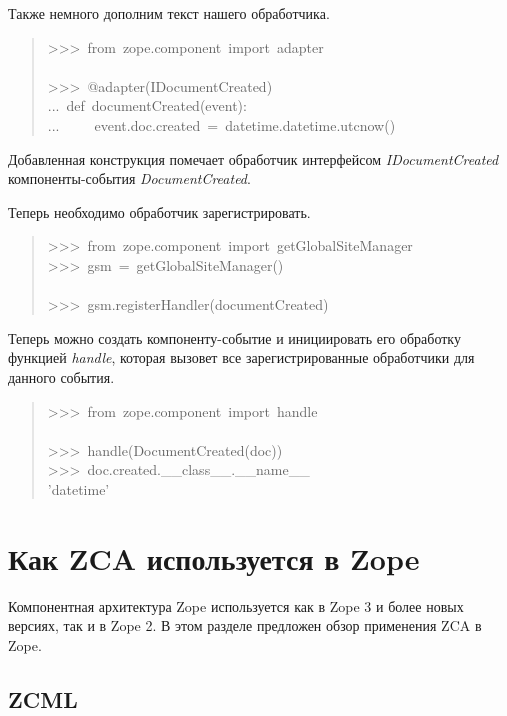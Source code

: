 \documentclass[14pt,a4paper,openany,twoside,final]{extbook}
\providecommand*{\DUroletitlereference}[1]{\textsl{#1}}
\begin{document}
Также немного дополним текст нашего обработчика.

\begin{quote}{\ttfamily \raggedright \noindent
>{}>{}>~from~zope.component~import~adapter\\
~\\
>{}>{}>~@adapter(IDocumentCreated)\\
...~def~documentCreated(event):\\
...~~~~~event.doc.created~=~datetime.datetime.utcnow()
}
\end{quote}

Добавленная конструкция помечает обработчик интерфейсом
\DUroletitlereference{IDocumentCreated} компоненты-события \DUroletitlereference{DocumentCreated}.

Теперь необходимо обработчик зарегистрировать.

\begin{quote}{\ttfamily \raggedright \noindent
>{}>{}>~from~zope.component~import~getGlobalSiteManager\\
>{}>{}>~gsm~=~getGlobalSiteManager()\\
~\\
>{}>{}>~gsm.registerHandler(documentCreated)
}
\end{quote}

Теперь можно создать компоненту-событие и инициировать его обработку
функцией \DUroletitlereference{handle}, которая вызовет все зарегистрированные обработчики
для данного события.

\begin{quote}{\ttfamily \raggedright \noindent
>{}>{}>~from~zope.component~import~handle\\
~\\
>{}>{}>~handle(DocumentCreated(doc))\\
>{}>{}>~doc.created.\_\_class\_\_.\_\_name\_\_\\
'datetime'
}
\end{quote}


\chapter{Как ZCA используется в Zope%
  \label{zca-zope}%
}

Компонентная архитектура Zope используется как в Zope 3 и более новых
версиях, так и в Zope 2.  В этом разделе предложен обзор применения
ZCA в Zope.


\section{ZCML%
  \label{zcml}%
}
\end{document}
